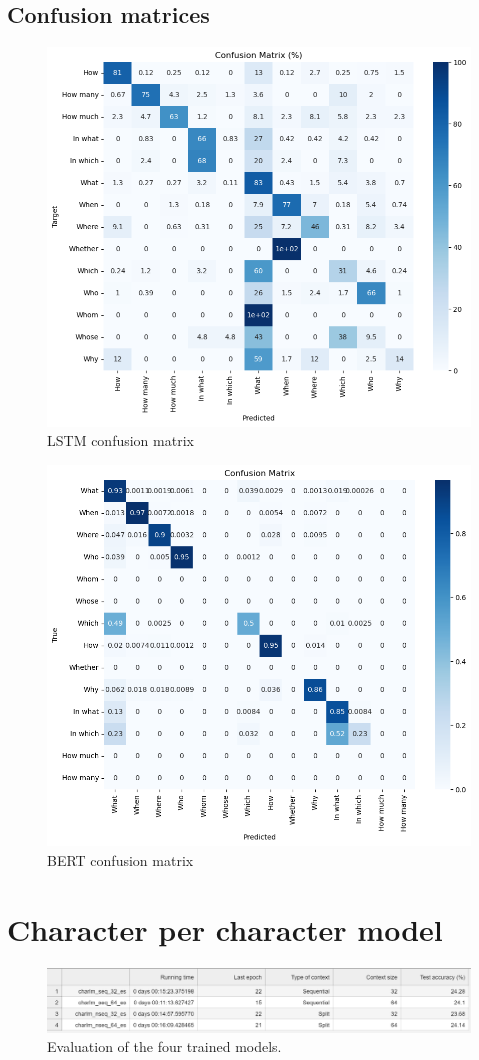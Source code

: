 \documentclass{article}
\begin{document}
\subsection{Confusion matrices}

\begin{figure}[ht]
    \centering
    \includegraphics[width=0.75\linewidth]{results/classification/lstm conf.png}
    \caption{LSTM confusion matrix}
    \label{fig:lstm-conf}
\end{figure}

\begin{figure}[ht]
    \centering
    \includegraphics[width=0.75\linewidth]{results/classification/conf bert.png}
    \caption{BERT confusion matrix}
    \label{fig:bert-conf}
\end{figure}
\newpage\newpage
\section{Character per character model}

\begin{figure}[ht]
    \centering
    \includegraphics[width=1.2\linewidth]{results/evaluation.png}
    \caption{Evaluation of the four trained models.}
    \label{fig:cpc_eval}
\end{figure}
\end{document}

